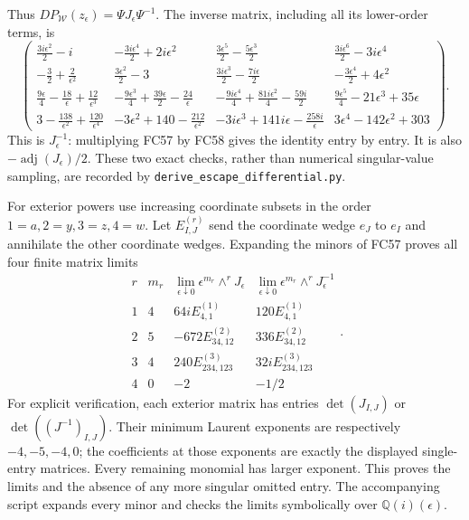 \documentclass[11pt]{article}
\begin{document}
Thus $D P_{\mathcal W}(z_\epsilon)=\Psi J_\epsilon\Psi^{-1}$.
The inverse matrix, including all its lower-order terms, is
\[
\renewcommand{\arraystretch}{1.25}
\begin{pmatrix}
 \frac{3i\epsilon^2}{2}-i&-\frac{3i\epsilon^4}{2}+2i\epsilon^2&
 \frac{3\epsilon^5}{2}-\frac{5\epsilon^3}{2}&\frac{3i\epsilon^6}{2}-3i\epsilon^4\\
 -\frac32+\frac2{\epsilon^2}&\frac{3\epsilon^2}{2}-3&
 \frac{3i\epsilon^3}{2}-\frac{7i\epsilon}{2}&-\frac{3\epsilon^4}{2}+4\epsilon^2\\
 \frac{9\epsilon}{4}-\frac{18}{\epsilon}+\frac{12}{\epsilon^3}&
 -\frac{9\epsilon^3}{4}+\frac{39\epsilon}{2}-\frac{24}{\epsilon}&
 -\frac{9i\epsilon^4}{4}+\frac{81i\epsilon^2}{4}-\frac{59i}{2}&
 \frac{9\epsilon^5}{4}-21\epsilon^3+35\epsilon\\
 3-\frac{138}{\epsilon^2}+\frac{120}{\epsilon^4}&
 -3\epsilon^2+140-\frac{212}{\epsilon^2}&
 -3i\epsilon^3+141i\epsilon-\frac{258i}{\epsilon}&
 3\epsilon^4-142\epsilon^2+303
\end{pmatrix}.
\tag{FC58}
\]
This is $J_\epsilon^{-1}$: multiplying FC57 by FC58 gives the identity
entry by entry. It is also $-\operatorname{adj}(J_\epsilon)/2$.
These two exact checks, rather than numerical singular-value sampling,
are recorded by \texttt{derive\_escape\_differential.py}.

For exterior powers use increasing coordinate subsets in the order
$1=a,2=y,3=z,4=w$. Let $E^{(r)}_{I,J}$ send the coordinate wedge
$e_J$ to $e_I$ and annihilate the other coordinate wedges. Expanding
the minors of FC57 proves all four finite matrix limits
\[
\begin{array}{c|c|c|c}
 r&m_r&\displaystyle\lim_{\epsilon\downarrow0}
       \epsilon^{m_r}\wedge^rJ_\epsilon&
 \displaystyle\lim_{\epsilon\downarrow0}
       \epsilon^{m_r}\wedge^rJ_\epsilon^{-1}\\\hline
 1&4&64iE^{(1)}_{4,1}&120E^{(1)}_{4,1}\\
 2&5&-672E^{(2)}_{34,12}&336E^{(2)}_{34,12}\\
 3&4&240E^{(3)}_{234,123}&32iE^{(3)}_{234,123}\\
 4&0&-2&-1/2
\end{array}.
\tag{FC59}
\]
For explicit verification, each exterior matrix has entries
$\det(J_{I,J})$ or $\det((J^{-1})_{I,J})$. Their minimum Laurent
exponents are respectively $-4,-5,-4,0$; the coefficients at those
exponents are exactly the displayed single-entry matrices. Every
remaining monomial has larger exponent. This proves the limits and
the absence of any more singular omitted entry. The accompanying
script expands every minor and checks the limits symbolically over
$\mathbb Q(i)(\epsilon)$.
\end{document}
